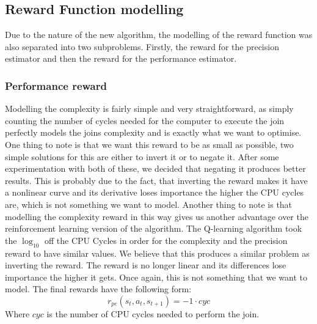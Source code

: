 \subsection{Reward Function modelling}
Due to the nature of the new algorithm, the modelling of the reward function was also separated into two subproblems. Firstly, the reward for the precision estimator and then the reward for the performance estimator.
\subsubsection{Performance reward}
Modelling the complexity is fairly simple and very straightforward, as simply counting the number of cycles needed for the computer to execute the join perfectly models the joins complexity and is exactly what we want to optimise. One thing to note is that we want this reward to be as small as possible, two simple solutions for this are either to invert it or to negate it. After some experimentation with both of these, we decided that negating it produces better results. This is probably due to the fact, that inverting the reward makes it have a nonlinear curve and its derivative loses importance the higher the CPU cycles are, which is not something we want to model. Another thing to note is that modelling the complexity reward in this way gives us another advantage over the reinforcement learning version of the algorithm. The Q-learning algorithm took the $\log_{10}$ off the CPU Cycles in order for the complexity and the precision reward to have similar values. We believe that this produces a similar problem as inverting the reward. The reward is no longer linear and its differences lose importance the higher it gets. Once again, this is not something that we want to model. The final rewards have the following form:
\begin{equation}
	r_{pe}(s_t,a_t,s_{t+1}) = -1 \cdot cyc
\end{equation}
Where $cyc$ is the number of CPU cycles needed to perform the join.
